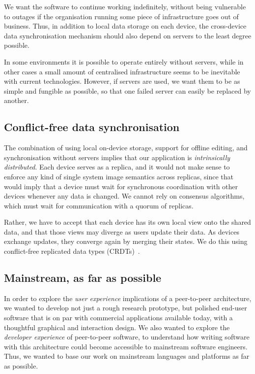 \documentclass[sigplan,10pt]{acmart}
\begin{document}
We want the software to continue working indefinitely, without being vulnerable to outages if the organisation running some piece of infrastructure goes out of business.
Thus, in addition to local data storage on each device, the cross-device data synchronisation mechanism should also depend on servers to the least degree possible.

In some environments it is possible to operate entirely without servers, while in other cases a small amount of centralised infrastructure seems to be inevitable with current technologies.
However, if servers are used, we want them to be as simple and fungible as possible, so that one failed server can easily be replaced by another.

\subsection{Conflict-free data synchronisation}

The combination of using local on-device storage, support for offline editing, and synchronisation without servers implies that our application is \emph{intrinsically distributed}.
Each device serves as a replica, and it would not make sense to enforce any kind of single system image semantics across replicas, since that would imply that a device must wait for synchronous coordination with other devices whenever any data is changed.
We cannot rely on consensus algorithms, which must wait for communication with a quorum of replicas.

Rather, we have to accept that each device has its own local view onto the shared data, and that those views may diverge as users update their data.
As devices exchange updates, they converge again by merging their states.
We do this using conflict-free replicated data types (CRDTs)~\cite{Shapiro:2011un}.

\subsection{Mainstream, as far as possible}

In order to explore the \emph{user experience} implications of a peer-to-peer architecture, we wanted to develop not just a rough research prototype, but polished end-user software that is on par with commercial applications available today, with a thoughtful graphical and interaction design.
We also wanted to explore the \emph{developer experience} of peer-to-peer software, to understand how writing software with this architecture could become accessible to mainstream software engineers.
Thus, we wanted to base our work on mainstream languages and platforms as far as possible.
\end{document}
